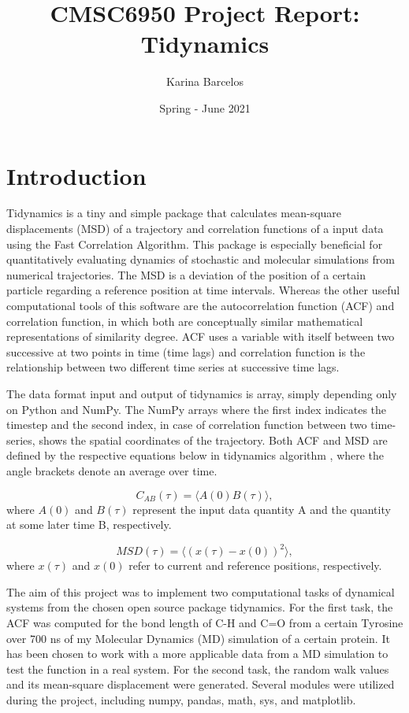 \documentclass{article}
\title{CMSC6950 Project Report: Tidynamics}
\author{Karina Barcelos}
\date{Spring - June 2021}
\begin{document}
\maketitle

\section{Introduction}

Tidynamics \cite{Buyl2018} is a tiny and simple package that calculates mean-square displacements (MSD) of a trajectory and correlation functions of a input data using the Fast Correlation Algorithm. \cite{kneller1995nmoldyn} This package is especially beneficial for quantitatively evaluating dynamics of stochastic and molecular simulations from numerical trajectories. The MSD is a deviation of the position of a certain particle regarding a reference position at time intervals. Whereas the other useful computational tools of this software are the autocorrelation function (ACF) and correlation function, in which both are conceptually similar mathematical representations of similarity degree. ACF uses a variable with itself between two successive at two points in time (time lags) and correlation function is the relationship between two different time series at successive time lags.

The data format input and output of tidynamics \cite{Buyl2018} is array, simply depending only on Python and NumPy. The NumPy arrays where the first index indicates the timestep and the second index, in case of correlation function between two time-series, shows the spatial coordinates of the trajectory. Both ACF and MSD are defined by the respective equations below in tidynamics algorithm \cite{Buyl2018}, where the angle brackets denote an average over time. \cite{kneller1995nmoldyn}

\begin{equation}
C_{AB}(\tau) = \langle A(0) B(\tau) \rangle,
\label{correlation}
\end{equation}
where  $A(0)$ and $B(\tau)$ represent the input data quantity A and the quantity at some later time B, respectively.

\begin{equation}
MSD(\tau) = \langle (x(\tau) - x(0) )^2 \rangle,
\label{msd}
\end{equation}
where $x(\tau)$ and $x(0)$ refer to current and reference positions, respectively.

The aim of this project was to implement two computational tasks of dynamical systems from the chosen open source package tidynamics\cite{Buyl2018}. For the first task, the ACF was computed for the bond length of C-H and C=O from a certain Tyrosine over 700 ns of my Molecular Dynamics (MD) simulation of a certain protein. It has been chosen to work with a more applicable data from a MD simulation to test the function in a real system. For the second task, the random walk values and its mean-square displacement were generated. Several modules were utilized during the project, including numpy, pandas, math, sys, and matplotlib.
\end{document}
